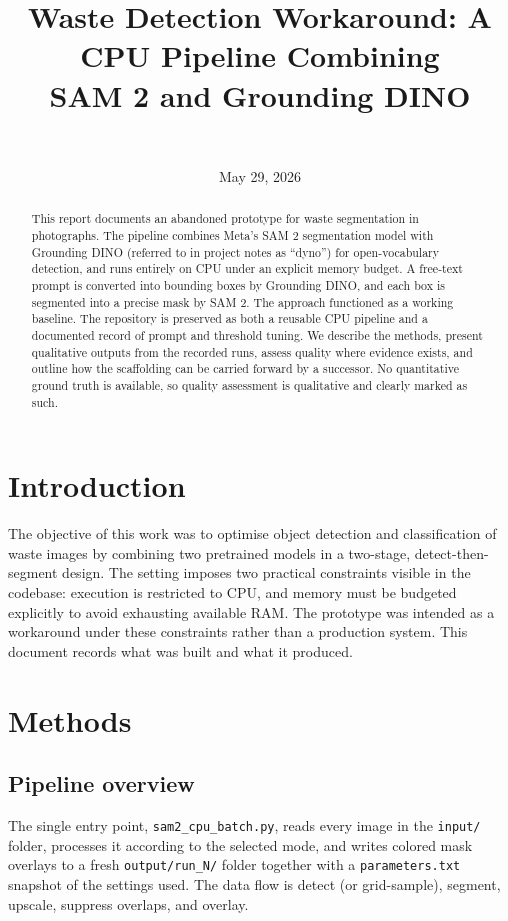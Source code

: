 \documentclass[11pt]{article}
\title{Waste Detection Workaround: A CPU Pipeline Combining\\
SAM 2 and Grounding DINO}
\author{\fillin{author} \\ \fillin{affiliation}}
\date{May 29, 2026}
\begin{document}
\maketitle

\begin{abstract}
This report documents an abandoned prototype for waste segmentation in
photographs. The pipeline combines Meta's SAM 2 segmentation model with
Grounding DINO (referred to in project notes as ``dyno'') for open-vocabulary
detection, and runs entirely on CPU under an explicit memory budget. A
free-text prompt is converted into bounding boxes by Grounding DINO, and each
box is segmented into a precise mask by SAM 2. The approach functioned as a
working baseline. The repository is preserved as both a reusable CPU pipeline
and a documented record of prompt and threshold tuning. We describe the
methods, present qualitative outputs from the recorded runs, assess quality
where evidence exists, and outline how the scaffolding can be carried forward by
a successor. No quantitative ground truth is available, so quality assessment is
qualitative and clearly marked as such.
\end{abstract}

\section{Introduction}
The objective of this work was to optimise object detection and classification
of waste images by combining two pretrained models in a two-stage,
detect-then-segment design. The setting imposes two practical constraints
visible in the codebase: execution is restricted to CPU, and memory must be
budgeted explicitly to avoid exhausting available RAM. The prototype was
intended as a workaround under these constraints rather than a production
system. This document records what was built and what it produced.

\section{Methods}

\subsection{Pipeline overview}
The single entry point, \texttt{sam2\_cpu\_batch.py}, reads every image in the
\texttt{input/} folder, processes it according to the selected mode, and writes
colored mask overlays to a fresh \texttt{output/run\_N/} folder together with a
\texttt{parameters.txt} snapshot of the settings used. The data flow is
detect (or grid-sample), segment, upscale, suppress overlaps, and overlay.
\end{document}
